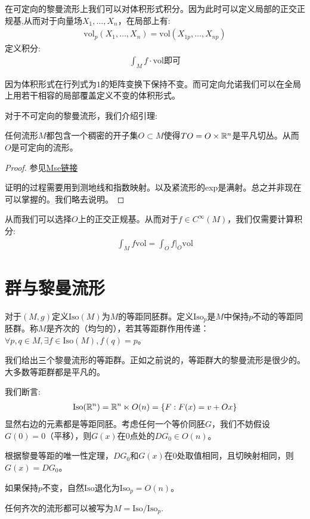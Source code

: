 在可定向的黎曼流形上我们可以对体积形式积分。因为此时可以定义局部的正交正规基,从而对于向量场$X_1,\dots,X_n$，在局部上有:
\begin{align*}
    \mathrm{vol}_p(X_1,\dots,X_n)=\mathrm{vol}(X_{1p},\dots,X_{np})
\end{align*}
定义积分:
\begin{align*}
    \int_M f \cdot \mathrm{vol}\text{即可}
\end{align*}

因为体积形式在行列式为$1$的矩阵变换下保持不变。而可定向允诺我们可以在全局上用若干相容的局部覆盖定义不变的体积形式。

对于不可定向的黎曼流形，我们介绍引理:
\begin{lemma}
    任何流形$M$都包含一个稠密的开子集$O \subset M$使得$TO=O \times \mathbb{R}^n$是平凡切丛。从而$O$是可定向的流形。
\end{lemma}
\begin{proof}
    参见\href{https://math.stackexchange.com/questions/18083/is-every-compact-n-manifold-a-compactification-of-mathbbrn}{Mse链接}

    证明的过程需要用到测地线和指数映射。以及紧流形的exp是满射。总之并非现在可以掌握的。我们略去说明。
\end{proof}
从而我们可以选择$O$上的正交正规基。从而对于$f \in C^\infty(M)$，我们仅需要计算积分:
\begin{align*}
    \int_M f \mathrm{vol}=\int_O f|_O \mathrm{vol}
\end{align*}
\section{群与黎曼流形}
对于$(M,g)$定义$\mathrm{Iso}(M)$为$M$的等距同胚群。定义$\mathrm{Iso}_p$是$M$中保持$p$不动的等距同胚群。称$M$是齐次的（均匀的），若其等距群作用传递：$\forall p,q \in M, \exists f\in \mathrm{Iso}(M),f(q)=p$。

我们给出三个黎曼流形的等距群。正如之前说的，等距群大的黎曼流形是很少的。大多数等距群都是平凡的。
\begin{example}[$\R^n$]
    我们断言:
    \begin{align*}
        \mathrm{Iso}(\mathbb{R}^n)=\mathbb{R}^n \ltimes O(n)=\{F:F(x)=v+Ox\}
    \end{align*}
    显然右边的元素都是等距同胚。考虑任何一个等价同胚$G$，我们不妨假设$G(0)=0$（平移），则$G(x)$在$0$点处的$DG_0 \in O(n)$。

    根据黎曼等距的唯一性定理，$DG_0$和$G(x)$在$0$处取值相同，且切映射相同，则$G(x)=DG_0$。

    如果保持$p$不变，自然$\mathrm{Iso}$退化为$\mathrm{Iso}_p=O(n)$。
\end{example}
\begin{proposition}
    任何齐次的流形都可以被写为$M=\mathrm{Iso}/\mathrm{Iso}_p$.
\end{proposition}

